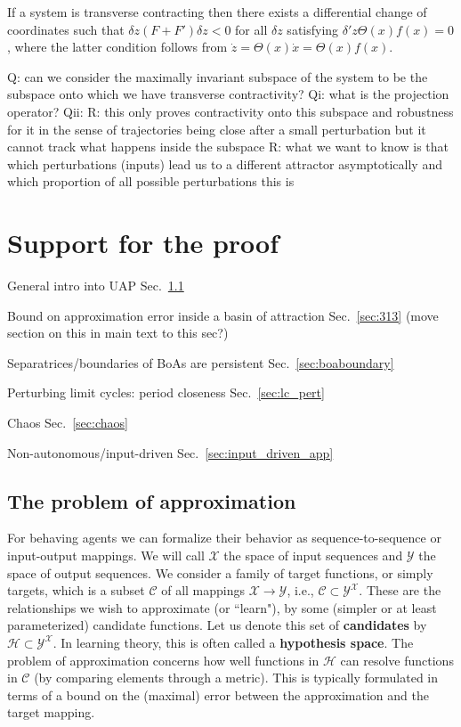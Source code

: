 \documentclass{article}
\newcommand{\ascomment}[1]{\textcolor{ascolor}{(#1)}}
\newcounter{ct}
\begin{document}
If a system is transverse contracting then there exists a differential change of coordinates such that $\delta z(F + F')\delta z < 0$ for all $\delta z$ satisfying $\delta' z \Theta(x)f (x) = 0$, where the latter condition follows from  $\dot z= \Theta(x) \dot x = \Theta(x)f (x)$.

Q: can we consider the maximally invariant subspace of the system to be the subspace onto which we have transverse contractivity?
Qi: what is the projection operator?
Qii: 
R: this only proves contractivity onto this subspace and robustness for it in the sense of trajectories being close after a small perturbation but it cannot track what happens inside the subspace
R: what we want to know is that which perturbations (inputs) lead us to a different attractor asymptotically and which proportion of all possible perturbations this is 






\newpage
\section{Support for the proof}
General intro into UAP Sec.~\ref{sec:approximationtheory}

Bound on approximation error inside a basin of attraction Sec.~\ref{sec:313} \ascomment{move section on this in main text to this sec?}

Separatrices/boundaries of BoAs are persistent Sec.~\ref{sec:boaboundary}

Perturbing limit cycles: period closeness Sec.~\ref{sec:lc_pert}

Chaos Sec.~\ref{sec:chaos} 

Non-autonomous/input-driven Sec.~\ref{sec:input_driven_app} 

\subsection{The problem of approximation}\label{sec:approximationtheory} %
For behaving agents we can formalize their behavior as sequence-to-sequence or input-output mappings.
We will call $\mathcal{X}$ the space of input sequences and $\mathcal{Y}$ the space of output sequences.
We consider a family of target functions, or simply targets, which is a subset \(\mathcal{C} \) of all mappings \( \mathcal{X} \rightarrow \mathcal{Y} \), i.e., \( \mathcal{C} \subset \mathcal{Y}^\mathcal{X} \). 
These are the relationships we wish to approximate (or ``learn"), by some (simpler or at least parameterized) candidate functions.
Let us denote this set of \textbf{candidates} by \( \mathcal{H} \subset \mathcal{Y}^\mathcal{X} \).
In learning theory, this is often called a \textbf{hypothesis space}.
The problem of approximation concerns how well functions in \( \mathcal{H} \) can resolve functions in \( \mathcal{C} \) (by comparing elements through a metric).
This is typically formulated in terms of a bound on the (maximal) error between the approximation and the target mapping.
\end{document}
